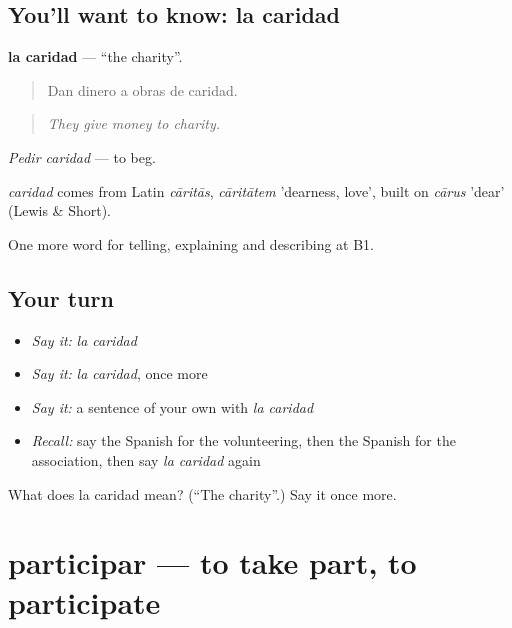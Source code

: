 \subsection*{You'll want to know: la caridad}
\textbf{la caridad} — \textquotedblleft{}the charity\textquotedblright{}.

\begin{quote}
Dan dinero a obras de caridad.
\end{quote}

\begin{quote}
\emph{They give money to charity.}
\end{quote}

\emph{Pedir caridad} — to beg.

\begin{cousinweb}
\emph{caridad} comes from Latin \emph{cāritās}, \emph{cāritātem} 'dearness, love', built on \emph{cārus} 'dear' (Lewis \& Short).
\end{cousinweb}

\begin{grammarlens}[title={What you've built}]
One more word for telling, explaining and describing at B1.
\end{grammarlens}

\subsection*{Your turn}
\begin{itemize}
\raggedright
  \item \emph{Say it:} \emph{la caridad}
  \item \emph{Say it:} \emph{la caridad}, once more
  \item \emph{Say it:} a sentence of your own with \emph{la caridad}
  \item \emph{Recall:} say the Spanish for the volunteering, then the Spanish for the association, then say \emph{la caridad} again
\end{itemize}

\begin{tcolorbox}[breakable,colback=teal!4,colframe=teal!35!black,title={Before you move on}]
What does la caridad mean? (\textquotedblleft{}The charity\textquotedblright{}.) Say it once more.
\end{tcolorbox}
\section[participar]{participar — to take part, to participate}


